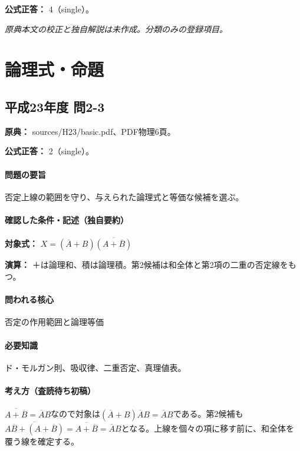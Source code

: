 \textbf{公式正答：} 4（single）。

\par\textit{原典本文の校正と独自解説は未作成。分類のみの登録項目。}

\section{論理式・命題}

\subsection{平成23年度 問2-3}
\label{q:h23-reg-basic-2-3}

\noindent\textbf{原典：} sources/H23/basic.pdf、PDF物理6頁。

\textbf{公式正答：} 2（single）。

\paragraph{問題の要旨} 否定上線の範囲を守り、与えられた論理式と等価な候補を選ぶ。

\paragraph{確認した条件・記述（独自要約）}\mbox{}\par

\noindent\textbf{対象式：} \(X=(\overline A+B)\overline{(A+\overline B)}\)\par

\noindent\textbf{演算：} ＋は論理和、積は論理積。第2候補は和全体と第2項の二重の否定線をもつ。\par

\paragraph{問われる核心} 否定の作用範囲と論理等価

\paragraph{必要知識} ド・モルガン則、吸収律、二重否定、真理値表。

\paragraph{考え方（査読待ち初稿）} \(\overline{A+\overline B}=\overline A B\)なので対象は\((\overline A+B)\overline A B=\overline A B\)である。第2候補も\(\overline{A\overline B+(A+\overline B)}=\overline{A+\overline B}=\overline A B\)となる。上線を個々の項に移す前に、和全体を覆う線を確定する。


